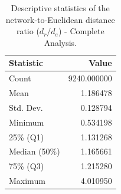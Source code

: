 \begin{table}[htbp]
\caption{Descriptive statistics of the network-to-Euclidean distance ratio ($d_r/d_e$) - Complete Analysis.}
\label{tab:stats_ratio_updated}
\begin{tabular}{lr}
\toprule
Statistic & Value \\
\midrule
Count & 9240.000000 \\
Mean & 1.186478 \\
Std. Dev. & 0.128794 \\
Minimum & 0.534198 \\
25\% (Q1) & 1.131268 \\
Median (50\%) & 1.165661 \\
75\% (Q3) & 1.215280 \\
Maximum & 4.010950 \\
\bottomrule
\end{tabular}
\end{table}
